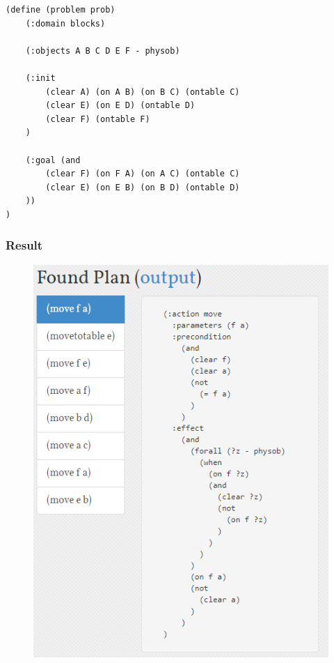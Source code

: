 ﻿\documentclass[a4paper, 11pt]{article}
\begin{document}
\begin{lstlisting}[title=problem\_blocks.pddl]
(define (problem prob)
    (:domain blocks)

    (:objects A B C D E F - physob)

    (:init
        (clear A) (on A B) (on B C) (ontable C)
        (clear E) (on E D) (ontable D)        
        (clear F) (ontable F)
    )

    (:goal (and
        (clear F) (on F A) (on A C) (ontable C)
        (clear E) (on E B) (on B D) (ontable D)
    ))
)
\end{lstlisting}

\subsubsection{Result}
\begin{figure}[h]
  \centering
  \includegraphics[width=13cm]{Pic/blocksresult.png}
\end{figure}




%
%
\end{document}
